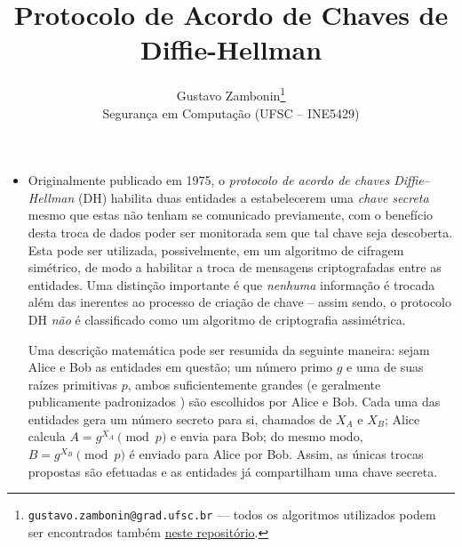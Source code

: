\documentclass{article}
\title{\textbf{Protocolo de Acordo de Chaves de Diffie-Hellman}}
\author{Gustavo Zambonin\thanks{\texttt{gustavo.zambonin@grad.ufsc.br} ---
todos os algoritmos utilizados podem ser encontrados
também \href{https://github.com/zambonin/ufsc-ine5429}{neste repositório}.} \\
\small {Segurança em Computação (UFSC -- INE5429)} \vspace{-5mm}}
\date{}
\begin{document}
\maketitle

\begin{itemize}

\item Originalmente publicado em 1975, o \emph{protocolo de acordo de chaves
Diffie--Hellman} (DH) \cite{Diffie:2006:NDC:2263321.2269104} habilita duas
entidades a estabelecerem uma \emph{chave secreta} mesmo que estas não tenham se
comunicado previamente, com o benefício desta troca de dados poder ser
monitorada sem que tal chave seja descoberta. Esta pode ser utilizada,
possivelmente, em um algoritmo de cifragem simétrico, de modo a habilitar a
troca de mensagens criptografadas entre as entidades. Uma distinção importante é
que \emph{nenhuma} informação é trocada além das inerentes ao processo de
criação de chave -- assim sendo, o protocolo DH \emph{não} é classificado como
um algoritmo de criptografia assimétrica.

Uma descrição matemática pode ser resumida da seguinte maneira: sejam Alice e
Bob as entidades em questão; um número primo $g$ e uma de suas raízes primitivas
$p$, ambos suficientemente grandes (e geralmente publicamente padronizados
\cite{rfc5114}) são escolhidos por Alice e Bob. Cada uma das entidades gera
um número secreto para si, chamados de $X_A$ e $X_B$; Alice calcula $A = g^{X_A}
\pmod{p}$ e envia para Bob; do mesmo modo, $B = g^{X_B} \pmod{p}$ é enviado para
Alice por Bob. Assim, as únicas trocas propostas são efetuadas e as entidades já
compartilham uma chave secreta.


\end{itemize}
\end{document}
